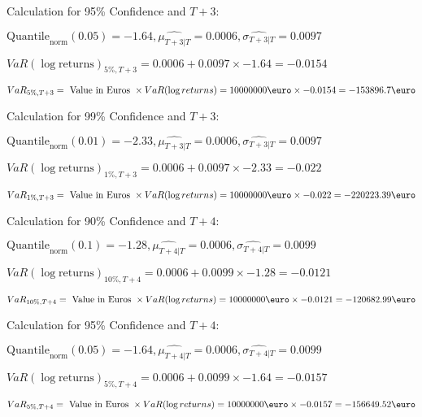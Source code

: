 Calculation for 95\% Confidence and $T+3$:

\indent\indent $\text{Quantile}_\text{norm}(0.05) = -1.64,\hat{\mu_{T+3|T}} = 0.0006, \hat{\sigma_{T+3|T}} = 0.0097$

\indent\indent $VaR(\log \text{returns})_{5\%, T + 3} = 0.0006 + 0.0097\times-1.64 = -0.0154$

\indent\indent $VaR_{5\%, T + 3} = \text{ Value in Euros } \times VaR(\log returns) = 10 000 000 \text{\euro} \times-0.0154 = -153896.7 \text{\euro}$\newline




Calculation for 99\% Confidence and $T+3$:

\indent\indent $\text{Quantile}_\text{norm}(0.01) = -2.33,\hat{\mu_{T+3|T}} = 0.0006, \hat{\sigma_{T+3|T}} = 0.0097$

\indent\indent $VaR(\log \text{returns})_{1\%, T + 3} = 0.0006 + 0.0097\times-2.33 = -0.022$

\indent\indent $VaR_{1\%, T + 3} = \text{ Value in Euros } \times VaR(\log returns) = 10 000 000 \text{\euro} \times-0.022 = -220223.39 \text{\euro}$\newline




Calculation for 90\% Confidence and $T+4$:

\indent\indent $\text{Quantile}_\text{norm}(0.1) = -1.28,\hat{\mu_{T+4|T}} = 0.0006, \hat{\sigma_{T+4|T}} = 0.0099$

\indent\indent $VaR(\log \text{returns})_{10\%, T + 4} = 0.0006 + 0.0099\times-1.28 = -0.0121$

\indent\indent $VaR_{10\%, T + 4} = \text{ Value in Euros } \times VaR(\log returns) = 10 000 000 \text{\euro} \times-0.0121 = -120682.99 \text{\euro}$\newline




Calculation for 95\% Confidence and $T+4$:

\indent\indent $\text{Quantile}_\text{norm}(0.05) = -1.64,\hat{\mu_{T+4|T}} = 0.0006, \hat{\sigma_{T+4|T}} = 0.0099$

\indent\indent $VaR(\log \text{returns})_{5\%, T + 4} = 0.0006 + 0.0099\times-1.64 = -0.0157$

\indent\indent $VaR_{5\%, T + 4} = \text{ Value in Euros } \times VaR(\log returns) = 10 000 000 \text{\euro} \times-0.0157 = -156649.52 \text{\euro}$\newline




